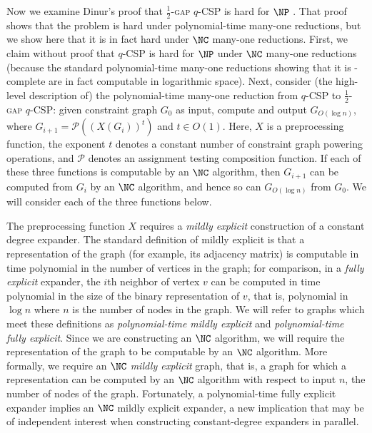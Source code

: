 Now we examine Dinur's proof that \textsc{$\frac{1}{2}$-gap $q$-CSP} is hard for $\NP$ \autocite{dinur07}.
That proof shows that the problem is hard under polynomial-time many-one reductions, but we show here that it is in fact hard under $\NC$ many-one reductions.
First, we claim without proof that \textsc{$q$-CSP} is hard for $\NP$ under $\NC$ many-one reductions (because the standard polynomial-time many-one reductions showing that it is \NP-complete are in fact computable in logarithmic space).
Next, consider (the high-level description of) the polynomial-time many-one reduction from \textsc{$q$-CSP} to \textsc{$\frac{1}{2}$-gap $q$-CSP}: given constraint graph $G_0$ as input, compute and output $G_{O(\log n)}$, where $G_{i + 1} = \mathcal{P}({\left(X(G_i)\right)}^t)$ and $t \in O(1)$.
Here, $X$ is a preprocessing function, the exponent $t$ denotes a constant number of constraint graph powering operations, and $\mathcal{P}$ denotes an assignment testing composition function.
If each of these three functions is computable by an $\NC$ algorithm, then $G_{i + 1}$ can be computed from $G_i$ by an $\NC$ algorithm, and hence so can $G_{O(\log n)}$ from $G_0$.
We will consider each of the three functions below.

The preprocessing function $X$ requires a \emph{mildly explicit} construction of a constant degree expander.
The standard definition of mildly explicit is that a representation of the graph (for example, its adjacency matrix) is computable in time polynomial in the number of vertices in the graph; for comparison, in a \emph{fully explicit} expander, the $i$th neighbor of vertex $v$ can be computed in time polynomial in the size of the binary representation of $v$, that is, polynomial in $\log n$ where $n$ is the number of nodes in the graph.
We will refer to graphs which meet these definitions as \emph{polynomial-time mildly explicit} and \emph{polynomial-time fully explicit}.
Since we are constructing an $\NC$ algorithm, we will require the representation of the graph to be computable by an $\NC$ algorithm.
More formally, we require an \emph{$\NC$ mildly explicit} graph, that is, a graph for which a representation can be computed by an $\NC$ algorithm with respect to input $n$, the number of nodes of the graph.
Fortunately, a polynomial-time fully explicit expander implies an $\NC$ mildly explicit expander, a new implication that may be of independent interest when constructing constant-degree expanders in parallel.

